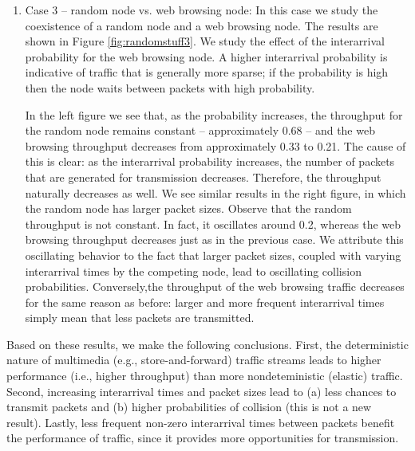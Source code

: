 \documentclass{llncs}
\begin{document}
\begin{enumerate}
	\item Case 3 -- random node vs. web browsing node: In this case we study the coexistence of a random node and a web browsing node. The results are shown in Figure \ref{fig:randomstuff3}. We study the effect of the interarrival probability for the web browsing node. A higher interarrival probability is indicative of traffic that is generally more sparse; if the probability is high then the node waits between packets with high probability. 

	In the left figure we see that, as the probability increases, the throughput for the random node remains constant -- approximately 0.68 -- and the web browsing throughput decreases from approximately 0.33 to 0.21. The cause of this is clear: as the interarrival probability increases, the number of packets that are generated for transmission decreases. Therefore, the throughput naturally decreases as well. We see similar results in the right figure, in which the random node has larger packet sizes. Observe that the random throughput is not constant. In fact, it oscillates around 0.2, whereas the web browsing throughput decreases just as in the previous case. We attribute this oscillating behavior to the fact that larger packet sizes, coupled with varying interarrival times by the competing node, lead to oscillating collision probabilities. Conversely,the throughput of the web browsing traffic decreases for the same reason as before: larger and more frequent interarrival times simply mean that less packets are transmitted.
\end{enumerate}

Based on these results, we make the following conclusions. First, the deterministic nature of multimedia (e.g., store-and-forward) traffic streams leads to higher performance (i.e., higher throughput) than more nondeteministic (elastic) traffic. Second, increasing interarrival times and packet sizes lead to (a) less chances to transmit packets and (b) higher probabilities of collision (this is not a new result). Lastly, less frequent non-zero interarrival times between packets benefit the performance of traffic, since it provides more opportunities for transmission.


\end{document}
